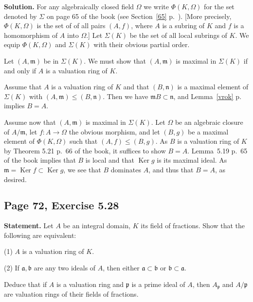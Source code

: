 \documentclass[parskip=half,fontsize=12pt]{scrartcl}%
\newcommand{\mf}{\mathfrak}
\newcommand{\aaa}{\mf a}
\newcommand{\bbb}{\mf b}
\newcommand{\mmm}{\mf m}
\newcommand{\nnn}{\mf n}
\newcommand{\ppp}{\mf p}
\newcommand{\Ker}{\operatorname{Ker}}\newcommand{\Coker}{\operatorname{Coker}}
\begin{document}
\textbf{Solution.} For any algebraically closed field $\Omega$ we write $\Phi(K,\Omega)$ for the set denoted by $\Sigma$ on page 65 of the book (see Section~\ref{65} p.~\pageref{65}). [More precisely, $\Phi(K,\Omega)$ is the set of of all pairs $(A,f)$, where $A$ is a subring of $K$ and $f$ is a homomorphism of $A$ into $\Omega$.] %
Let $\Sigma(K)$ be the set of all local subrings of $K$. We equip $\Phi(K,\Omega)$ and $\Sigma(K)$ with their obvious partial order.

Let $(A,\mmm)$ be in $\Sigma(K)$. We must show that $(A,\mmm)$ is maximal in $\Sigma(K)$ if and only if $A$ is a valuation ring of $K$.

Assume that $A$ is a valuation ring of $K$ and that $(B,\nnn)$ is a maximal element of $\Sigma(K)$ with $(A,\mmm)\le(B,\nnn)$. Then we have $\mmm B\subset\nnn$, and Lemma~\ref{vrok} p.~\pageref{vrok} implies $B=A$. %

Assume now that $(A,\mmm)$ is maximal in $\Sigma(K)$. Let $\Omega$ be an algebraic closure of $A/\mmm$, let $f:A\to\Omega$ the obvious morphism, and let $(B,g)$ be a maximal element of $\Phi(K,\Omega)$ such that $(A,f)\le(B,g)$. As $B$ is a valuation ring of $K$ by Theorem 5.21 p.~66 of the book, it suffices to show $B=A$. Lemma~5.19 p.~65 of the book implies that $B$ is local and that $\Ker g$ is its maximal ideal. As $\mmm=\Ker f\subset\Ker g$, we see that $B$ dominates $A$, and thus that $B=A$, as desired.

\subsection{Page 72, Exercise 5.28}\label{528}%

\textbf{Statement.} Let $A$ be an integral domain, $K$ its field of fractions. Show that the following are equivalent:

(1) $A$ is a valuation ring of $K$.

(2) If $\aaa, \bbb$ are any two ideals of $A$, then either $\aaa\subset\bbb$ or $\bbb\subset\aaa$.

Deduce that if $A$ is a valuation ring and $\ppp$ is a prime ideal of $A$, then $A_\ppp$  and $A/\ppp$ are valuation rings of their fields of fractions.
\end{document}
